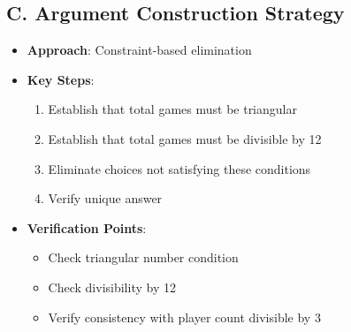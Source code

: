 \documentclass[12pt]{article}
\begin{document}
\begin{strategicbox}
\subsection*{C. Argument Construction Strategy}
\begin{itemize}[leftmargin=*]
    \item \textbf{Approach}: Constraint-based elimination
    \item \textbf{Key Steps}:
    \begin{enumerate}
        \item Establish that total games must be triangular
        \item Establish that total games must be divisible by 12
        \item Eliminate choices not satisfying these conditions
        \item Verify unique answer
    \end{enumerate}
    \item \textbf{Verification Points}: 
    \begin{itemize}
        \item Check triangular number condition
        \item Check divisibility by 12
        \item Verify consistency with player count divisible by 3
    \end{itemize}
\end{itemize}
\end{strategicbox}
\end{document}
